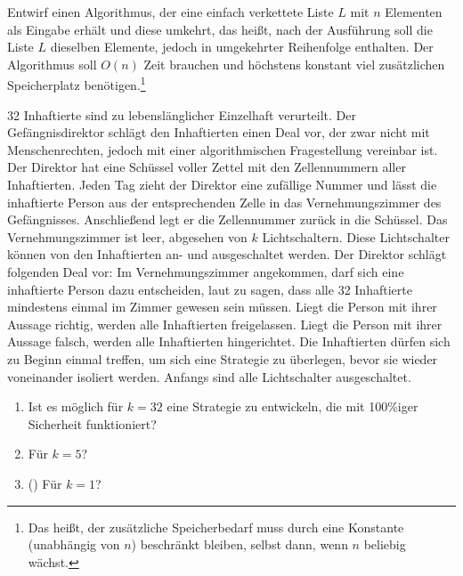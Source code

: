 \documentclass{uebung_cs}
\begin{document}
\begin{aufgabe}
	Entwirf einen Algorithmus, der eine einfach verkettete Liste $L$ mit $n$ Elementen als Eingabe erhält und diese umkehrt, das heißt, nach der Ausführung soll die Liste $L$ dieselben Elemente, jedoch in umgekehrter Reihenfolge enthalten.
	Der Algorithmus soll $O(n)$ Zeit brauchen und höchstens konstant viel zusätzlichen Speicherplatz benötigen.\footnote{Das heißt, der zusätzliche Speicherbedarf muss durch eine Konstante (unabhängig von $n$) beschränkt bleiben, selbst dann, wenn $n$ beliebig wächst.}
\end{aufgabe}

\begin{aufgabe}
	32 Inhaftierte sind zu lebenslänglicher Einzelhaft verurteilt.
	Der Gefängnisdirektor schlägt den Inhaftierten einen Deal vor, der zwar nicht mit Menschenrechten, jedoch mit einer algorithmischen Fragestellung vereinbar ist.
	Der Direktor hat eine Schüssel voller Zettel mit den Zellennummern aller Inhaftierten.
	Jeden Tag zieht der Direktor eine zufällige Nummer und lässt die inhaftierte Person aus der entsprechenden Zelle in das Vernehmungszimmer des Gefängnisses. Anschließend legt er die Zellennummer zurück in die Schüssel.
	Das Vernehmungszimmer ist leer, abgesehen von $k$ Lichtschaltern.
	Diese Lichtschalter können von den Inhaftierten an- und ausgeschaltet werden.
	Der Direktor schlägt folgenden Deal vor:
	Im Vernehmungszimmer angekommen, darf sich eine inhaftierte Person dazu entscheiden, laut zu sagen, dass alle 32 Inhaftierte mindestens einmal im Zimmer gewesen sein müssen.
	Liegt die Person mit ihrer Aussage richtig, werden alle Inhaftierten freigelassen.
	Liegt die Person mit ihrer Aussage falsch, werden alle Inhaftierten hingerichtet.
	Die Inhaftierten dürfen sich zu Beginn einmal treffen, um sich eine Strategie zu überlegen, bevor sie wieder voneinander isoliert werden.
	Anfangs sind alle Lichtschalter ausgeschaltet.
	
	\begin{enumerate}
		\item Ist es möglich für $k=32$ eine Strategie zu entwickeln, die mit 100\%iger Sicherheit funktioniert?
		\item Für $k=5$?
		\item (\veryhard) Für $k=1$?
	\end{enumerate}
\end{aufgabe}
\end{document}
